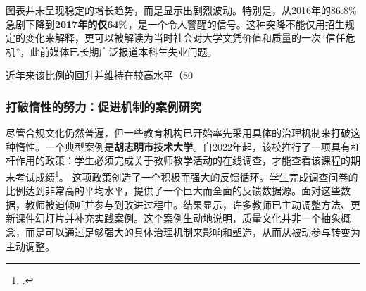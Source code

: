 图表并未呈现稳定的增长趋势，而是显示出剧烈波动。特别是，从2016年的86.8\%急剧下降到\textbf{2017年的仅64\%}，是一个令人警醒的信号。这种突降不能仅用招生规定的变化来解释，更可以被解读为当时社会对大学文凭价值和质量的一次“信任危机”，此前媒体已长期广泛报道本科生失业问题。

近年来该比例的回升并维持在较高水平（80%

\subsubsection{打破惰性的努力：促进机制的案例研究}
尽管合规文化仍然普遍，但一些教育机构已开始率先采用具体的治理机制来打破这种惰性。一个典型案例是\textbf{胡志明市技术大学}。自2022年起，该校推行了一项具有杠杆作用的政策：学生必须完成关于教师教学活动的在线调查，才能查看该课程的期末考试成绩\footcite{hutech_khao_sat_2022}。
这项政策创造了一个积极而强大的反馈循环。学生完成调查问卷的比例达到非常高的平均水平，提供了一个巨大而全面的反馈数据源。面对这些数据，教师被迫倾听并参与到改进过程中。结果显示，许多教师已主动调整方法、更新课件幻灯片并补充实践案例。这个案例生动地说明，质量文化并非一个抽象概念，而是可以通过足够强大的具体治理机制来影响和塑造，从而从被动参与转变为主动调整。
























